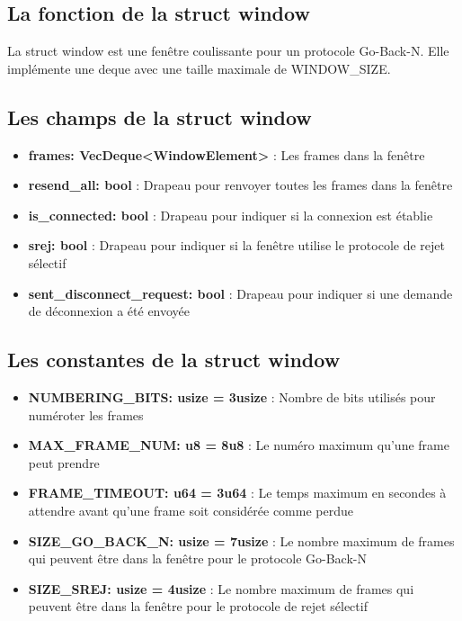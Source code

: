 \documentclass[french]{article}
\begin{document}
\subsection{La fonction de la struct window} 
La struct window est une fenêtre coulissante pour un protocole Go-Back-N. Elle
implémente une deque avec une taille maximale de WINDOW\_SIZE. 

\subsection{Les champs de la struct window} 
\begin{itemize}
    \item \textbf{frames: VecDeque<WindowElement>} : Les frames dans la fenêtre
    \item \textbf{resend\_all: bool} : Drapeau pour renvoyer toutes les frames dans la fenêtre
    \item \textbf{is\_connected: bool} : Drapeau pour indiquer si la connexion est établie
    \item \textbf{srej: bool} : Drapeau pour indiquer si la fenêtre utilise le protocole de rejet sélectif
    \item \textbf{sent\_disconnect\_request: bool} : Drapeau pour indiquer si une demande de déconnexion a été envoyée 
  \end{itemize} 

  \subsection{Les constantes de la struct window} 
  \begin{itemize}
    \item \textbf{NUMBERING\_BITS: usize = 3usize} : Nombre de bits utilisés pour numéroter les frames
    \item \textbf{MAX\_FRAME\_NUM: u8 = 8u8} : Le numéro maximum qu'une frame peut prendre
    \item \textbf{FRAME\_TIMEOUT: u64 = 3u64} : Le temps maximum en secondes à attendre avant qu'une frame soit considérée comme perdue
    \item \textbf{SIZE\_GO\_BACK\_N: usize = 7usize} : Le nombre maximum de frames qui peuvent être dans la fenêtre pour le protocole Go-Back-N
    \item \textbf{SIZE\_SREJ: usize = 4usize} : Le nombre maximum de frames qui peuvent être dans la fenêtre pour le protocole de rejet sélectif
  \end{itemize}
\end{document}
